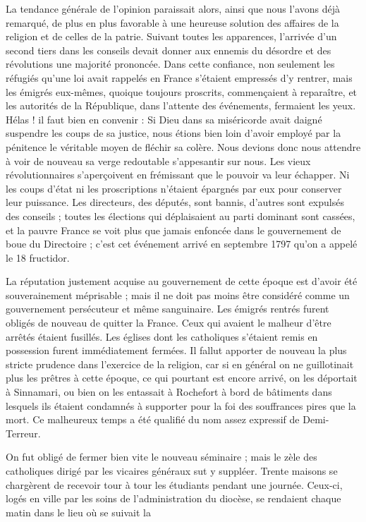 La tendance générale de l'opinion paraissait alors, ainsi que nous l'avons déjà remarqué, de plus en plus favorable à une heureuse solution des affaires de la religion et de celles de la patrie. Suivant toutes les apparences, l'arrivée d'un second tiers dans les conseils devait donner aux ennemis du désordre et des révolutions une majorité prononcée. Dans cette confiance, non seulement les réfugiés qu'une loi avait rappelés en France s'étaient empressés d'y rentrer, mais les émigrés eux-mêmes, quoique toujours proscrits, commençaient à reparaître, et les autorités de la République, dans l'attente des événements, fermaient les yeux. Hélas ! il faut bien en convenir : Si Dieu dans sa miséricorde avait daigné suspendre les coups de sa justice, nous étions bien loin d'avoir employé par la pénitence le véritable moyen de fléchir sa colère. Nous devions donc nous attendre à voir de nouveau sa verge redoutable s'appesantir sur nous. Les vieux révolutionnaires s'aperçoivent en frémissant que le pouvoir va leur échapper. Ni les coups d'état ni les proscriptions n'étaient épargnés par eux pour conserver leur puissance. Les directeurs,
des députés, sont bannis, d'autres sont expulsés des conseils ; toutes les élections qui déplaisaient au parti dominant sont cassées, et la pauvre France se voit plus que jamais enfoncée dans le gouvernement de boue du Directoire ; c'est cet événement arrivé en septembre 1797 qu'on a appelé le 18 fructidor.

La réputation justement acquise au gouvernement de cette époque est d'avoir été souverainement méprisable ; mais il ne doit pas moins être considéré comme un gouvernement persécuteur et même sanguinaire. Les émigrés rentrés furent obligés de nouveau de quitter la France. Ceux qui avaient le malheur d'être arrêtés étaient fusillés. Les églises dont les catholiques s'étaient remis en possession furent immédiatement fermées. Il fallut apporter de nouveau la plus stricte prudence dans l'exercice de la religion, car si en général on ne guillotinait plus les prêtres à cette époque, ce qui pourtant est encore arrivé, on les déportait à Sinnamari, ou bien on les entassait à Rochefort à bord de bâtiments dans lesquels ils étaient condamnés à supporter pour la foi des souffrances pires que la mort. Ce malheureux temps a été qualifié du nom assez expressif de Demi-Terreur.

On fut obligé de fermer bien vite le nouveau séminaire ; mais le zèle des catholiques dirigé par les vicaires généraux sut y suppléer. Trente maisons se chargèrent de recevoir tour à tour les étudiants pendant une journée. Ceux-ci, logés en ville par les soins de l'administration du diocèse, se rendaient chaque matin dans le lieu où se suivait la


